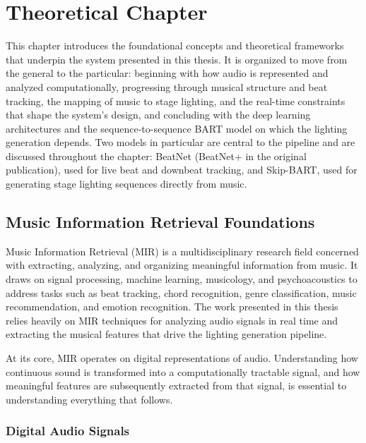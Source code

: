 \chapter{Theoretical Chapter}
\label{chap:theoretical-background}



This chapter introduces the foundational concepts and theoretical frameworks that underpin the system presented in this thesis. It is organized to move from the general to the particular: beginning with how audio is represented and analyzed computationally, progressing through musical structure and beat tracking, the mapping of music to stage lighting, and the real-time constraints that shape the system's design, and concluding with the deep learning architectures and the sequence-to-sequence BART model on which the lighting generation depends. Two models in particular are central to the pipeline and are discussed throughout the chapter: BeatNet (BeatNet+ in the original publication), used for live beat and downbeat tracking, and Skip-BART, used for generating stage lighting sequences directly from music.

\section{Music Information Retrieval Foundations}
\label{sec:ch2-mir-foundations}

Music Information Retrieval (MIR) is a multidisciplinary research field concerned with extracting, analyzing, and organizing meaningful information from music. It draws on signal processing, machine learning, musicology, and psychoacoustics to address tasks such as beat tracking, chord recognition, genre classification, music recommendation, and emotion recognition\cite{hendrikpurwins20191}. The work presented in this thesis relies heavily on MIR techniques for analyzing audio signals in real time and extracting the musical features that drive the lighting generation pipeline.

At its core, MIR operates on digital representations of audio. Understanding how continuous sound is transformed into a computationally tractable signal, and how meaningful features are subsequently extracted from that signal, is essential to understanding everything that follows.

\subsection{Digital Audio Signals}

